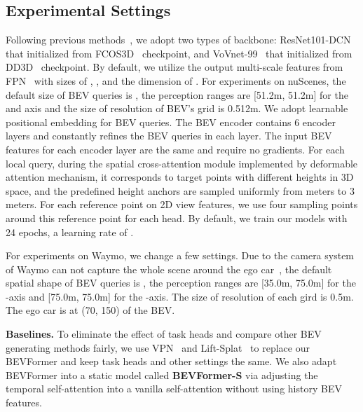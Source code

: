 \documentclass{article}
\begin{document}
\subsection{Experimental Settings}\label{details}
Following previous methods~\cite{wang2021fcos3d,wang2022detr3d,park2021pseudo}, we adopt two types of backbone: ResNet101-DCN~\cite{he2016deep,dai2017deformable} that initialized from FCOS3D~\cite{wang2021fcos3d} checkpoint, and VoVnet-99~\cite{lee2019energy} that initialized from DD3D~\cite{park2021pseudo} checkpoint. By default, we utilize the output multi-scale features from FPN~\cite{Lin2017FeaturePN} with sizes of , ,  and the dimension of  . For experiments on nuScenes, the default size of BEV queries is , the perception ranges are [51.2m, 51.2m] for the  and  axis and the size of resolution  of BEV’s grid is 0.512m. We adopt learnable positional embedding for BEV queries.
The BEV encoder contains 6 encoder layers and constantly refines the BEV queries in each layer. The input BEV features  for each encoder layer are the same and require no gradients. For each local query, during the spatial cross-attention module implemented by deformable attention mechanism, it corresponds to  target points with different heights in 3D space, and the predefined height anchors are sampled uniformly from  meters to 3 meters. For each reference point on 2D view features, we use four sampling points around this reference point for each head.
By default, we train our models with 24 epochs, a learning rate of .  


For experiments on Waymo, we change a few settings. Due to the camera system of Waymo can not capture the whole scene around the ego car~\cite{sun2020scalability}, the default spatial shape of BEV queries is , the perception ranges are [35.0m, 75.0m] for the -axis and  [75.0m, 75.0m] for the -axis. The size of resolution  of each gird is 0.5m. The ego car is at (70, 150) of the BEV. 

\noindent\textbf{Baselines.} To eliminate the effect of task heads and compare other BEV generating methods fairly, we use VPN~\cite{pan2020cross} and Lift-Splat~\cite{philion2020lift} to replace our BEVFormer and keep task heads and other settings the same.  We  also adapt BEVFormer into a static model called \textbf{BEVFormer-S} via adjusting the temporal self-attention into a vanilla self-attention without using history BEV features.
\end{document}
